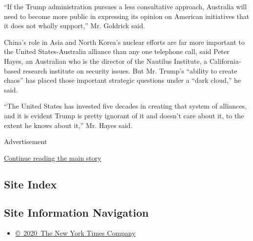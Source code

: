 ``If the Trump administration pursues a less consultative approach,
Australia will need to become more public in expressing its opinion on
American initiatives that it does not wholly support,'' Mr. Goldrick
said.

China's role in Asia and North Korea's nuclear efforts are far more
important to the United States-Australia alliance than any one telephone
call, said Peter Hayes, an Australian who is the director of the
Nautilus Institute, a California-based research institute on security
issues. But Mr. Trump's ``ability to create chaos'' has placed those
important strategic questions under a ``dark cloud,'' he said.

``The United States has invested five decades in creating that system of
alliances, and it is evident Trump is pretty ignorant of it and doesn't
care about it, to the extent he knows about it,'' Mr. Hayes said.

Advertisement

\protect\hyperlink{after-bottom}{Continue reading the main story}

\hypertarget{site-index}{%
\subsection{Site Index}\label{site-index}}

\hypertarget{site-information-navigation}{%
\subsection{Site Information
Navigation}\label{site-information-navigation}}

\begin{itemize}
\tightlist
\item
  \href{https://help.nytimes.com/hc/en-us/articles/115014792127-Copyright-notice}{©~2020~The
  New York Times Company}
\end{itemize}

